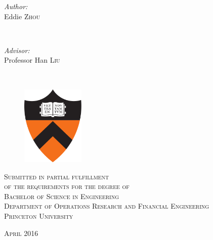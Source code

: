 \documentclass[11pt, notitlepage]{report}
\begin{document}
\begin{titlepage}
\begin{minipage}{0.4\textwidth}
\begin{flushleft} \large
\emph{Author:}\\
Eddie \textsc{Zhou} %
\end{flushleft}
\end{minipage}
~
\begin{minipage}{0.4\textwidth}
\begin{flushright} \large
\emph{Advisor:} \\
Professor Han \textsc{Liu} %
\end{flushright}
\end{minipage}\\[1cm]

\vspace{2em}
\begin{figure}[H]
\centering
\includegraphics[width=30mm]{figs/princeton_shield}
\end{figure}

\vspace{4em}
 
\textsc{
Submitted in partial fulfillment\\
of the requirements for the degree of\\
Bachelor of Science in Engineering\\
Department of Operations Research and Financial Engineering\\
Princeton University
}\\[0.5cm]

\vspace{2em}

\textsc{\large April 2016}\\[5mm] %
\pagestyle{empty}


\end{titlepage}
\end{document}
